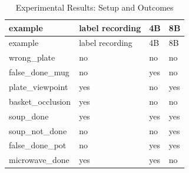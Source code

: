 \FloatBarrier\begingroup\small\setlength{\tabcolsep}{2.5pt}
\begin{longtable}[]{@{}
  >{\raggedright\arraybackslash}p{}
  >{\raggedright\arraybackslash}p{}
  >{\raggedright\arraybackslash}p{}
  >{\raggedright\arraybackslash}p{}@{}}
\caption{Experimental Results: Setup and Outcomes}\label{tab:s09-3}\tabularnewline
\toprule\noalign{}
\begin{minipage}[b]{\linewidth}\raggedright
example
\end{minipage} & \begin{minipage}[b]{\linewidth}\raggedright
label recording
\end{minipage} & \begin{minipage}[b]{\linewidth}\raggedright
4B
\end{minipage} & \begin{minipage}[b]{\linewidth}\raggedright
8B
\end{minipage} \\
\midrule\noalign{}
\endfirsthead
\toprule\noalign{}
\begin{minipage}[b]{\linewidth}\raggedright
example
\end{minipage} & \begin{minipage}[b]{\linewidth}\raggedright
label recording
\end{minipage} & \begin{minipage}[b]{\linewidth}\raggedright
4B
\end{minipage} & \begin{minipage}[b]{\linewidth}\raggedright
8B
\end{minipage} \\
\midrule\noalign{}
\endhead
\bottomrule\noalign{}
\endlastfoot
wrong\_plate & no & no & no \\
false\_done\_mug & no & yes & no \\
plate\_viewpoint & yes & no & yes \\
basket\_occlusion & yes & no & no \\
soup\_done & yes & yes & yes \\
soup\_not\_done & no & no & yes \\
false\_done\_pot & no & yes & yes \\
microwave\_done & yes & yes & no \\
\end{longtable}\endgroup

